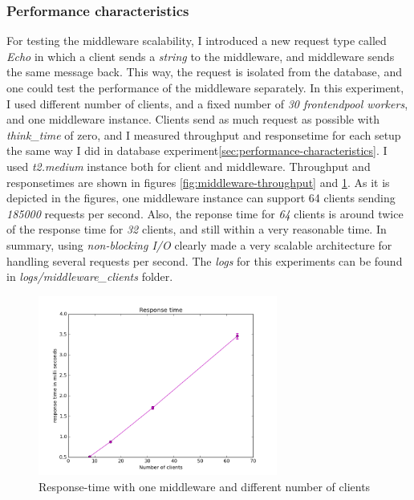 \documentclass[11pt]{article}
\begin{document}
\subsubsection{Performance characteristics}\label{sec:performance-characteristics-1}
For testing the middleware scalability, I introduced a new request type called \emph{Echo}
in which a client sends a \emph{string} to the middleware, and middleware sends the 
same message back. This way, the request is isolated from the database, and one could 
test the performance of the middleware separately. In this experiment, I used different 
number of clients, and a fixed number of \emph{30 frontendpool workers}, and 
one middleware instance. Clients send as much request as possible with \emph{think\_time}
of zero, and I measured throughput and response\-time for each set\-up the same way I did in database experiment\ref{sec:performance-characteristics}.
I used \emph{t2.medium} instance both for client and middleware. 
Throughput and response\-times are shown in figures \ref{fig:middleware-throughput} and \ref{fig:middleware-response-time}.
As it is depicted in the figures, one middleware instance can support 64 clients sending 
\emph{185000} requests per second. Also, the reponse time for 
\emph{64} clients is around twice of the response time for 
\emph{32} clients, and still within a very reasonable time.
In summary, using \emph{non-blocking I/O} clearly made a very 
scalable architecture for handling several requests per second. 
The \emph{logs} for this experiments can be found in \emph{logs/middleware\_clients}
folder.

\begin{figure}[H]
  \includegraphics[width=0.7\textwidth,page=1]{figures/middleware-response-time}
  \centering
  \caption{Response-time with one middleware and different number of clients}
  \label{fig:middleware-response-time}
\end{figure}
\end{document}
